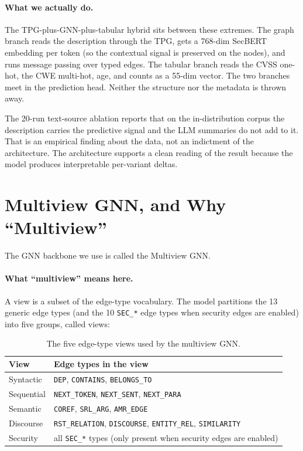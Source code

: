 \documentclass[11pt]{article}
\begin{document}
\paragraph{What we actually do.}
The TPG-plus-GNN-plus-tabular hybrid sits between these extremes. The
graph branch reads the description through the TPG, gets a 768-dim
SecBERT embedding per token (so the contextual signal is preserved on
the nodes), and runs message passing over typed edges. The tabular
branch reads the CVSS one-hot, the CWE multi-hot, age, and counts as a
55-dim vector. The two branches meet in the prediction head. Neither
the structure nor the metadata is thrown away.

The 20-run text-source ablation reports that on the in-distribution
corpus the description carries the predictive signal and the LLM
summaries do not add to it. That is an empirical finding about the
data, not an indictment of the architecture. The architecture supports
a clean reading of the result because the model produces interpretable
per-variant deltas.

\section{Multiview GNN, and Why ``Multiview''}

The GNN backbone we use is called the Multiview GNN.

\paragraph{What ``multiview'' means here.}
A view is a subset of the edge-type vocabulary. The model partitions
the 13 generic edge types (and the 10 \texttt{SEC\_*} edge types when
security edges are enabled) into five groups, called views:

\begin{table}[h]
\centering
\small
\begin{tabular}{ll}
\toprule
View & Edge types in the view \\
\midrule
Syntactic  & \texttt{DEP}, \texttt{CONTAINS}, \texttt{BELONGS\_TO} \\
Sequential & \texttt{NEXT\_TOKEN}, \texttt{NEXT\_SENT}, \texttt{NEXT\_PARA} \\
Semantic   & \texttt{COREF}, \texttt{SRL\_ARG}, \texttt{AMR\_EDGE} \\
Discourse  & \texttt{RST\_RELATION}, \texttt{DISCOURSE}, \texttt{ENTITY\_REL}, \texttt{SIMILARITY} \\
Security   & all \texttt{SEC\_*} types (only present when security edges are enabled) \\
\bottomrule
\end{tabular}
\caption{The five edge-type views used by the multiview GNN.}
\end{table}
\end{document}
